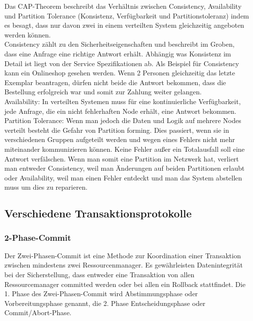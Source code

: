 \documentclass[letterpaper, 12pt]{article}
\let\tempsubsection\subsection
\renewcommand\subsection[1]{\vspace{0cm}\tempsubsection{#1}\vspace{0cm}}
\let\tempsubsubsection\subsubsection
\renewcommand\subsubsection[1]{\vspace{0cm}\tempsubsubsection{#1}\vspace{0cm}}
\begin{document}
Das CAP-Theorem beschreibt das Verhältnis zwischen Consistency, Availability und Partition Tolerance
(Konsistenz, Verfügbarkeit und Partitionstoleranz) indem es besagt, dass nur davon zwei in
einem verteilten System gleichzeitig angeboten werden können. \\
Consistency zählt zu den Sicherheitseigenschaften und beschreibt im Groben, dass eine Anfrage eine richtige Antwort erhält. Abhängig was Konsistenz im Detail ist liegt von der Service Spezifikationen ab. Als Beispiel für Consistency kann ein Onlineshop gesehen werden. Wenn 2 Personen
gleichzeitig das letzte Exemplar beantragen, dürfen nicht beide die Antwort bekommen, dass die
Bestellung erfolgreich war und somit zur Zahlung weiter gelangen. \\
Availability: In verteilten Systemen muss für eine kontinuierliche Verfügbarkeit, jede Anfrage, die ein nicht fehlerhaften Node erhält, eine Antwort bekommen. \\
Partition Tolerance: Wenn man jedoch die Daten und Logik auf mehrere
Nodes verteilt besteht die Gefahr von Partition forming. Dies passiert, wenn sie in verschiedenen
Gruppen aufgeteilt werden und wegen eines Fehlers nicht
mehr miteinander kommunizieren können. Keine Fehler außer ein Totalausfall soll eine Antwort
verfälschen. Wenn man somit eine Partition im Netzwerk hat, verliert man entweder Consistency,
weil man Änderungen auf beiden Partitionen erlaubt oder Availability, weil man einen
Fehler entdeckt und man das System abstellen muss um dies zu reparieren. \cite{ausarbeitungtra}

\subsection{Verschiedene Transaktionsprotokolle}

\subsubsection{2-Phase-Commit}

Der Zwei-Phasen-Commit ist eine Methode zur Koordination einer Transaktion zwischen mindestens
zwei Ressourcenmanager. Es gewährleisten Datenintegrität bei der Sicherstellung, dass entweder
eine Transaktion von allen Ressourcemanager committed werden oder bei allen ein Rollback
stattfindet. Die 1. Phase des Zwei-Phasen-Commit wird Abstimmungsphase oder Vorbereitungsphase
genannt, die 2. Phase Entscheidungsphase oder Commit/Abort-Phase. \cite{ausarbeitungtra}
\end{document}
